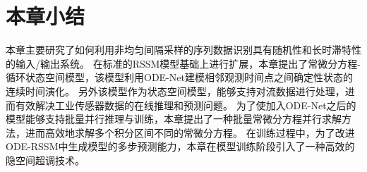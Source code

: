 \section{本章小结}
\label{sec:5_conclusion}
本章主要研究了如何利用非均匀间隔采样的序列数据识别具有随机性和长时滞特性的输入/输出系统。
在标准的RSSM模型基础上进行扩展，本章提出了常微分方程-循环状态空间模型，该模型利用ODE-Net建模相邻观测时间点之间确定性状态的连续时间演化。
另外该模型作为状态空间模型，能够支持对流数据进行处理，进而有效解决工业传感器数据的在线推理和预测问题。
为了使加入ODE-Net之后的模型能够支持批量并行推理与训练，本章提出了一种批量常微分方程并行求解方法，进而高效地求解多个积分区间不同的常微分方程。
在训练过程中，为了改进ODE-RSSM中生成模型的多步预测能力，本章在模型训练阶段引入了一种高效的隐空间超调技术。
